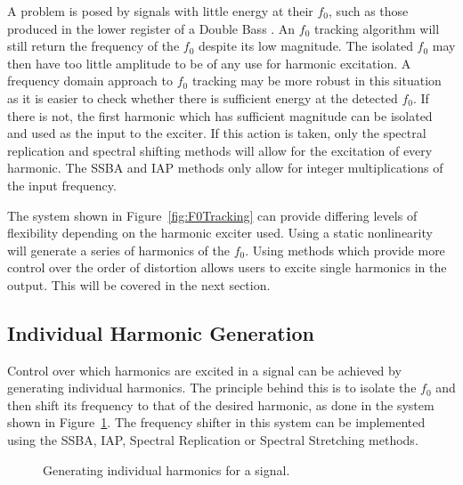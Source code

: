 		A problem is posed by signals with little energy at their $f_{0}$, such as those produced in the lower
		register of a Double Bass \citep{askenfelt2010double}. An $f_{0}$ tracking algorithm will still return the
		frequency of the $f_{0}$ despite its low magnitude. The isolated $f_{0}$ may then have too little amplitude
		to be of any use for harmonic excitation. A frequency domain approach to $f_{0}$ tracking may be more
		robust in this situation as it is easier to check whether there is sufficient energy at the detected
		$f_{0}$. If there is not, the first harmonic which has sufficient magnitude can be isolated and used as the
		input to the exciter. If this action is taken, only the spectral replication and spectral shifting methods
		will allow for the excitation of every harmonic. The SSBA and IAP methods only allow for integer
		multiplications of the input frequency.

		The system shown in Figure~\ref{fig:F0Tracking} can provide differing levels of flexibility depending on
		the harmonic exciter used. Using a static nonlinearity will generate a series of harmonics of the $f_{0}$.
		Using methods which provide more control over the order of distortion allows users to excite single
		harmonics in the output. This will be covered in the next section.

	\subsection{Individual Harmonic Generation}
	\label{sec:FeatureControl-Systems-Individuals}
		Control over which harmonics are excited in a signal can be achieved by generating individual harmonics.
		The principle behind this is to isolate the $f_{0}$ and then shift its frequency to that of the desired
		harmonic, as done in the system shown in Figure~\ref{fig:HarmonicGenerationSystem}.  The frequency shifter
		in this system can be implemented using the SSBA, IAP, Spectral Replication or Spectral Stretching methods.

		\begin{figure}[h!]
			\centering
			\caption{Generating individual harmonics for a signal.}
			\label{fig:HarmonicGenerationSystem}
		\end{figure}

